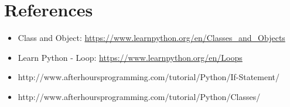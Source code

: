 \documentclass[11pt]{article}
\providecommand{\tightlist}{%
      \setlength{\itemsep}{0pt}\setlength{\parskip}{0pt}}
\begin{document}
    \section{References}\label{references}

\begin{itemize}
\tightlist
\item
  Class and Object:
  \url{https://www.learnpython.org/en/Classes_and_Objects}
\item
  Learn Python - Loop: \url{https://www.learnpython.org/en/Loops}
\item
  http://www.afterhoursprogramming.com/tutorial/Python/If-Statement/
\item
  http://www.afterhoursprogramming.com/tutorial/Python/Classes/
\end{itemize}


    
    
    
    
\end{document}
